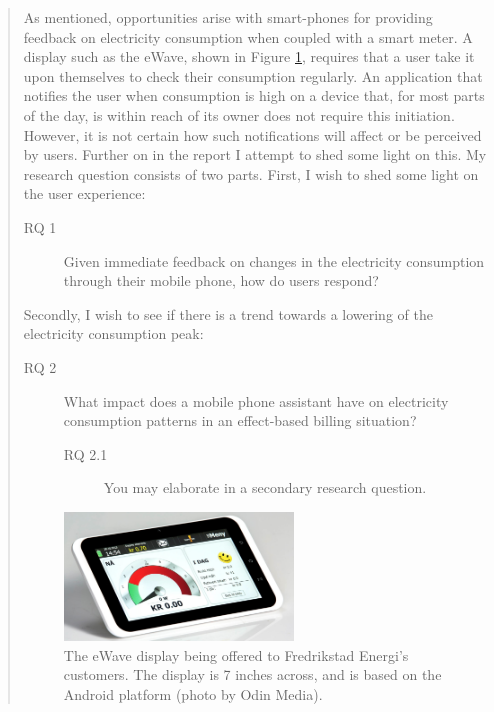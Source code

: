 \begin{quotation}
As mentioned, opportunities arise with smart-phones for providing feedback on electricity consumption when coupled with a smart meter. A display such as the eWave, shown in Figure \ref{fig:display}, requires that a user take it upon themselves to check their consumption regularly. An application that notifies the user when consumption is high on a device that, for most parts of the day, is within reach of its owner does not require this initiation. However, it is not certain how such notifications will affect or be perceived by users. Further on in the report I attempt to shed some light on this.
My research question consists of two parts. First, I wish to shed some light on the user experience:


\begin{description}
\item [RQ 1] Given immediate feedback on changes in the electricity consumption through their mobile phone, how do users respond?
\end{description}

Secondly, I wish to see if there is a trend towards a lowering of the electricity consumption peak:

\begin{description}
\item [RQ 2]  What impact does a mobile phone assistant have on electricity consumption patterns in an effect-based billing situation?
\begin{description}
\item [RQ 2.1] You may elaborate in a secondary research question.
\end{description}
\end{description}

\begin{figure}[h]
    \center
    \includegraphics[width=0.6\textwidth]{display}
    \caption{The eWave display being offered to Fredrikstad Energi’s customers. The display is 7 inches across, and is based on the Android platform (photo by Odin Media).}
    \label{fig:display}
\end{figure}

\end{quotation}

